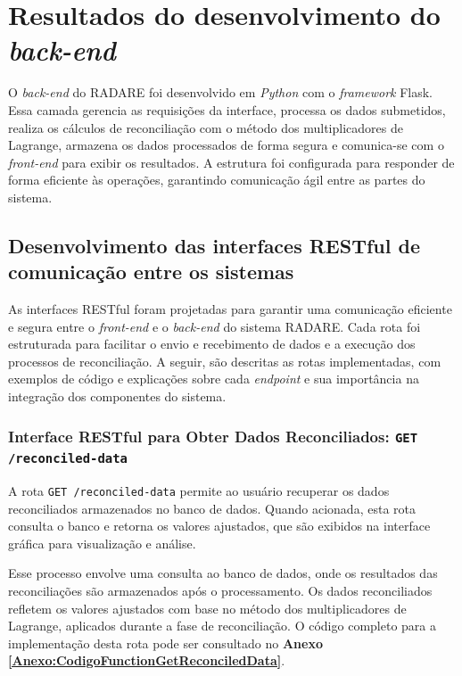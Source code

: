 \section{Resultados do desenvolvimento do \textit{back-end}}

O \textit{back-end} do RADARE foi desenvolvido em \textit{Python} com o \textit{framework} Flask. Essa camada gerencia as requisições da interface, processa os dados submetidos, realiza os cálculos de reconciliação com o método dos multiplicadores de Lagrange, armazena os dados processados de forma segura e comunica-se com o \textit{front-end} para exibir os resultados. A estrutura foi configurada para responder de forma eficiente às operações, garantindo comunicação ágil entre as partes do sistema.

\subsection{Desenvolvimento das interfaces RESTful de comunicação entre os sistemas}

As interfaces RESTful foram projetadas para garantir uma comunicação eficiente e segura entre o \textit{front-end} e o \textit{back-end} do sistema RADARE. Cada rota foi estruturada para facilitar o envio e recebimento de dados e a execução dos processos de reconciliação. A seguir, são descritas as rotas implementadas, com exemplos de código e explicações sobre cada \textit{endpoint} e sua importância na integração dos componentes do sistema.

\subsubsection{Interface RESTful para Obter Dados Reconciliados: \texttt{GET /reconciled-data}}

A rota \texttt{GET /reconciled-data} permite ao usuário recuperar os dados reconciliados armazenados no banco de dados. Quando acionada, esta rota consulta o banco e retorna os valores ajustados, que são exibidos na interface gráfica para visualização e análise.

Esse processo envolve uma consulta ao banco de dados, onde os resultados das reconciliações são armazenados após o processamento. Os dados reconciliados refletem os valores ajustados com base no método dos multiplicadores de Lagrange, aplicados durante a fase de reconciliação. O código completo para a implementação desta rota pode ser consultado no \textbf{Anexo \ref{Anexo:CodigoFunctionGetReconciledData}}.

